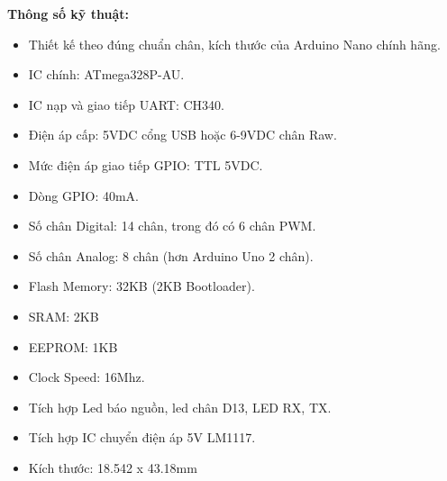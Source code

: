 \indent \textbf{Thông số kỹ thuật:}\\
\begin{itemize}
	\item Thiết kế theo đúng chuẩn chân, kích thước của Arduino Nano chính hãng.
	\item IC chính: ATmega328P-AU.
	\item IC nạp và giao tiếp UART: CH340.
	\item Điện áp cấp: 5VDC cổng USB hoặc 6-9VDC chân Raw.
	\item Mức điện áp giao tiếp GPIO: TTL 5VDC.
	\item Dòng GPIO: 40mA.
	\item Số chân Digital: 14 chân, trong đó có 6 chân PWM.
	\item Số chân Analog: 8 chân (hơn Arduino Uno 2 chân).
	\item Flash Memory: 32KB (2KB Bootloader).
	\item SRAM: 2KB
	\item EEPROM: 1KB
	\item Clock Speed: 16Mhz.
	\item Tích hợp Led báo nguồn, led chân D13, LED RX, TX.
	\item Tích hợp IC chuyển điện áp 5V LM1117.
	\item Kích thước: 18.542 x 43.18mm
\end{itemize}

